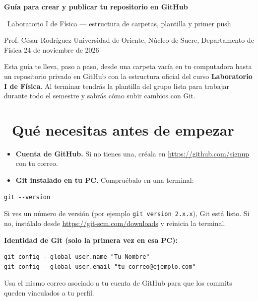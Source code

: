 \documentclass[11pt,a4paper]{article}
\newcommand{\iconoBanda}{microchip}
\newcommand{\bandaTitulo}[3][fondoOscuro]{%
  \begin{tcolorbox}[
    enhanced, colback=#1, colframe=#1, boxrule=0pt, arc=8pt, outer arc=8pt,
    width=\linewidth, top=18pt, bottom=6pt, left=14pt, right=14pt,
    borderline south={3.5pt}{0pt}{cyanNeon},
  ]
    \begin{minipage}[c]{0.07\linewidth}
      \centering
      \textcolor{cyanNeon}{\fontsize{30}{30}\selectfont\faIcon{\iconoBanda}}
    \end{minipage}%
    \hspace{8pt}%
    \begin{minipage}[c]{0.88\linewidth}
      {\fontsize{20}{24}\selectfont\bfseries\color{white}#2}\par\vspace{5pt}%
      \textcolor{cyanNeon!80!white}{\small\faIcon{angle-right}~#3}%
    \end{minipage}
    \vspace{4pt}
  \end{tcolorbox}%
  \vspace{8pt}%
}
\newcommand{\iconotexto}[2]{\textcolor{cyanNeon}{\faIcon{#1}}~#2}
\renewcommand{\iconoBanda}{flask}
\begin{document}
\bandaTitulo[fondoOscuro]{Guía para crear y publicar tu repositorio en GitHub}{Laboratorio I de Física --- estructura de carpetas, plantilla y primer push}

\begin{center}\small\color{grisTexto}Prof. César Rodríguez \textbar{} Universidad de Oriente, Núcleo de Sucre, Departamento de Física \textbar{} 24 de noviembre de 2026\end{center}

\begin{tcolorbox}[tarjetaDato,title={\faIcon{bullseye}~Objetivo de esta guía}]
Esta guía te lleva, paso a paso, desde una carpeta vacía en tu computadora hasta un repositorio privado en GitHub con la estructura oficial del curso \textbf{Laboratorio I de Física}. Al terminar tendrás la plantilla del grupo lista para trabajar durante todo el semestre y sabrás cómo subir cambios con Git.
\end{tcolorbox}

\section{\iconotexto{toolbox}{Qué necesitas antes de empezar}}

\begin{tcolorbox}[tarjetaIcono,title={\faIcon{check-circle}~Requisitos mínimos}]
\begin{itemize}[leftmargin=1.4em,itemsep=3pt,topsep=2pt]
  \item \textbf{Cuenta de GitHub.} Si no tienes una, créala en \url{https://github.com/signup} con tu correo.
  \item \textbf{Git instalado en tu PC.} Compruébalo en una terminal:
\end{itemize}
\begin{lstlisting}
git --version
\end{lstlisting}
Si ves un número de versión (por ejemplo \texttt{git version 2.x.x}), Git está listo. Si no, instálalo desde \url{https://git-scm.com/downloads} y reinicia la terminal.
\begin{tcolorbox}[cajaContenido]
\textbf{Identidad de Git (solo la primera vez en esa PC):}
\begin{lstlisting}
git config --global user.name "Tu Nombre"
git config --global user.email "tu-correo@ejemplo.com"
\end{lstlisting}
Usa el mismo correo asociado a tu cuenta de GitHub para que los commits queden vinculados a tu perfil.
\end{tcolorbox}
\end{tcolorbox}
\end{document}
